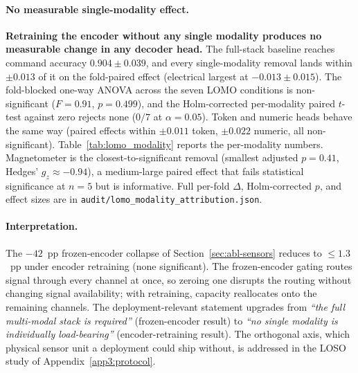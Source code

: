\documentclass[sensors,article,submit,moreauthors,pdftex]{Definitions/mdpi}
\begin{document}
\paragraph{No measurable single-modality effect.} \textbf{Retraining the encoder without any single modality produces no measurable change in any decoder head.} The full-stack baseline reaches command accuracy $0.904 \pm 0.039$, and every single-modality removal lands within $\pm 0.013$ of it on the fold-paired effect (electrical largest at $-0.013 \pm 0.015$). The fold-blocked one-way ANOVA across the seven LOMO conditions is non-significant ($F=0.91$, $p=0.499$), and the Holm-corrected per-modality paired $t$-test against zero rejects none ($0/7$ at $\alpha=0.05$). Token and numeric heads behave the same way (paired effects within $\pm 0.011$ token, $\pm 0.022$ numeric, all non-significant). Table~\ref{tab:lomo_modality} reports the per-modality numbers. Magnetometer is the closest-to-significant removal (smallest adjusted $p=0.41$, Hedges' $g_z \approx -0.94$), a medium-large paired effect that fails statistical significance at $n\!=\!5$ but is informative. Full per-fold $\Delta$, Holm-corrected $p$, and effect sizes are in \texttt{audit/lomo\_modality\_attribution.json}.



\paragraph{Interpretation.} The $-42$~pp frozen-encoder collapse of Section~\ref{sec:abl-sensors} reduces to $\le\!1.3$~pp under encoder retraining (none significant). The frozen-encoder gating routes signal through every channel at once, so zeroing one disrupts the routing without changing signal availability; with retraining, capacity reallocates onto the remaining channels. The deployment-relevant statement upgrades from \emph{``the full multi-modal stack is required''} (frozen-encoder result) to \emph{``no single modality is individually load-bearing''} (encoder-retraining result). The orthogonal axis, which physical sensor unit a deployment could ship without, is addressed in the LOSO study of Appendix~\ref{app3:protocol}.
\end{document}

